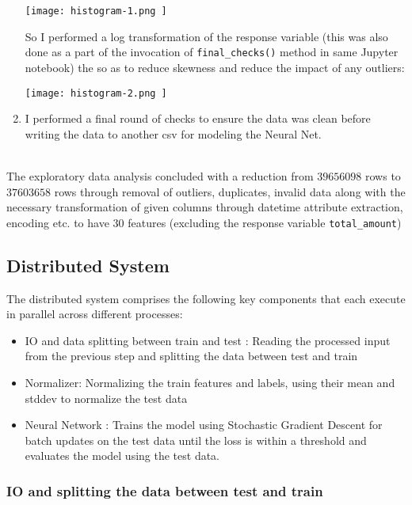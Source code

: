 \documentclass{article}
\begin{document}
\begin{enumerate}
    \begin{center}
    \texttt{[image: histogram-1.png ]}
    \end{center}

    So I performed a log transformation of the response variable (this was also done as a part of the invocation of \verb|final_checks()| method in same Jupyter notebook) the  so as to reduce skewness and reduce the impact of any outliers:

    \begin{center}
    \texttt{[image: histogram-2.png ]}
    \end{center}
    
    \item I performed a final round of checks to ensure the data was clean before writing the data to another csv for modeling the Neural Net.
\end{enumerate} \\

The exploratory data analysis concluded with a reduction from $39656098$ rows to $37603658$ rows through removal of outliers, duplicates, invalid data along with the necessary transformation of given columns through datetime attribute extraction, encoding etc. to have $30$ features (excluding the response variable \verb|total_amount|)

\subsection{Distributed System}
The distributed system comprises the following key components that each execute in parallel across different processes:
\begin{itemize}
    \item IO and data splitting between train and test : Reading the processed input from the previous step and splitting the data between test and train 
    \item Normalizer: Normalizing the train features and labels, using their mean and stddev to normalize the test data
    \item Neural Network : Trains the model using Stochastic Gradient Descent for batch updates on the test data until the loss is within a threshold and evaluates the model using the test data. 
\end{itemize}

\subsubsection{IO and splitting the data between test and train}
\end{document}
